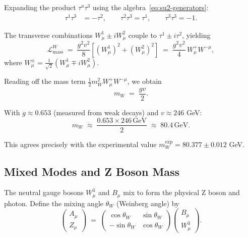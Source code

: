 \documentclass[11pt,a4paper]{article}
\newcommand{\Lag}{\mathcal{L}}
\theoremstyle{definition}
\theoremstyle{plain}
\theoremstyle{remark}
\begin{document}
Expanding the product $\tau^a\tau^3$ using the algebra~\eqref{eq:su2-generators}:
\begin{align}
  \tau^1\tau^3 &= -\tau^2, \qquad \tau^2\tau^3 = \tau^1, \qquad \tau^3\tau^3 = -1.
\end{align}

The transverse combinations $W_\mu^1 \pm i W_\mu^2$ couple to $\tau^1 \pm i\tau^2$, yielding
\begin{equation}
  \Lag_{\text{mass}}^{W} \;=\; \frac{g^2 v^2}{8}\left[(W_\mu^1)^2 + (W_\mu^2)^2\right]
  \;=\; \frac{g^2 v^2}{4}\,W_\mu^+ W^{-\mu},
\end{equation}
where $W_\mu^\pm = \frac{1}{\sqrt{2}}(W_\mu^1 \mp i W_\mu^2)$.

Reading off the mass term $\frac{1}{2}m_W^2 W_\mu^+ W^{-\mu}$, we obtain
\begin{equation}
  \boxed{m_W \;=\; \frac{gv}{2}.}
  \label{eq:w-mass}
\end{equation}

With $g \approx 0.653$ (measured from weak decays) and $v \approx 246$ GeV:
\begin{equation}
  m_W \;\approx\; \frac{0.653 \times 246\,\text{GeV}}{2} \;\approx\; 80.4\,\text{GeV}.
\end{equation}

This agrees precisely with the experimental value $m_W^{\exp} = 80.377 \pm 0.012$ GeV.

\subsection{Mixed Modes and Z Boson Mass}

The neutral gauge bosons $W_\mu^3$ and $B_\mu$ mix to form the physical Z boson and photon. Define the mixing angle $\theta_W$ (Weinberg angle) by
\begin{equation}
  \begin{pmatrix} A_\mu \\ Z_\mu \end{pmatrix}
  \;=\;
  \begin{pmatrix}
  \cos\theta_W & \sin\theta_W \\
  -\sin\theta_W & \cos\theta_W
  \end{pmatrix}
  \begin{pmatrix} B_\mu \\ W_\mu^3 \end{pmatrix}.
  \label{eq:mixing}
\end{equation}
\end{document}
